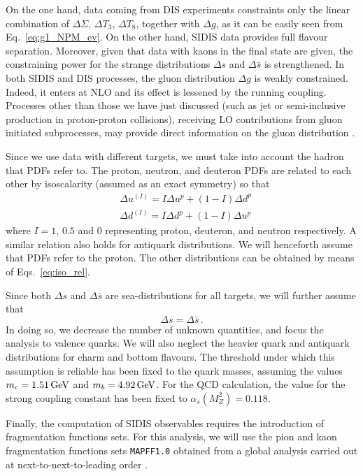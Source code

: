 On the one hand, data coming from DIS experiments constraints only the linear combination of $\Delta \Sigma$, $\Delta T_3$, $\Delta T_8$, together with $\Delta g$, as it can be easily seen from Eq.~\eqref{eq:g1_NPM_ev}. On the other hand, SIDIS data provides full flavour separation. Moreover, given that data with kaons in the final state are given, the constraining power for the strange distributions $\Delta s$ and $\Delta \bar{s}$ is strengthened. In both SIDIS and DIS processes, the gluon distribution $\Delta g$ is weakly constrained. Indeed, it enters at NLO and its effect is lessened by the running coupling. Processes other than those we have just discussed (such as jet or semi-inclusive production in proton-proton collisions), receiving LO contributions from gluon initiated subprocesses, may provide direct information on the gluon distribution \cite{Rojo:2015acz}.%

Since we use data with different targets, we must take into account the hadron that PDFs refer to. The proton, neutron, and deuteron PDFs are related to each other by isoscalarity (assumed as an exact symmetry) so that
\begin{equation}
  \begin{split}
    &\Delta u^{(I)} = I \Delta u^p + ( 1 - I ) \Delta d^p \\
    &\Delta d^{(I)} = I \Delta d^p + ( 1 - I ) \Delta u^p
  \end{split}
  \label{eq:iso_rel}
\end{equation}
where $I=1$, $0.5$ and $0$ representing proton, deuteron, and neutron respectively. A similar relation also holds for antiquark distributions. We will henceforth assume that PDFs refer to the proton. The other distributions can be obtained by means of Eqs.~\eqref{eq:iso_rel}.%

Since both $\Delta s$ and $\Delta \bar{s}$ are sea-distributions for all targets, we will further assume that
\begin{equation}
  \Delta s = \Delta \bar{s} \,.
\end{equation}
In doing so, we decrease the number of unknown quantities, and focus the analysis to valence quarks. We will also neglect the heavier quark and antiquark distributions for charm and bottom flavours. The threshold under which this assumption is reliable has been fixed to the quark masses, assuming the values $m_c=1.51\, \textrm{GeV}$ and $m_b=4.92\, \textrm{GeV}$. For the QCD calculation, the value for the strong coupling constant has been fixed to $\alpha_s(M_Z^2) = 0.118$.\par
Finally, the computation of SIDIS observables requires the introduction of fragmentation functions sets. For this analysis, we will use the pion and kaon fragmentation functions sets \texttt{MAPFF1.0} obtained from a global analysis carried out at next-to-next-to-leading order \cite{Khalek:2021gxf, AbdulKhalek:2022laj}.

